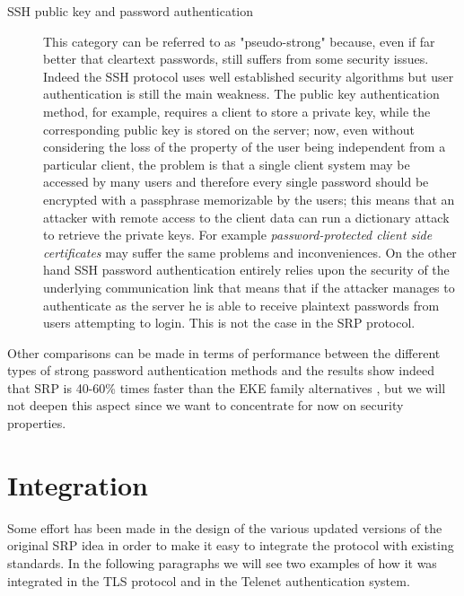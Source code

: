 \documentclass[11pt]{article}
\begin{document}
\begin{description}
	\item [SSH public key and password authentication] This category can be referred to as "pseudo-strong" because, even if far better that cleartext passwords, still suffers from some security issues. Indeed the SSH protocol uses well established security algorithms but user authentication is still the main weakness. The public key authentication method, for example, requires a client to store a private key, while the corresponding public key is stored on the server; now, even without considering the loss of the property of the user being independent from a particular client, the problem is that a single client system may be accessed by many users and therefore every single password should be encrypted with a passphrase memorizable by the users; this means that an attacker with remote access to the client data can run a dictionary attack to retrieve the private keys. For example \emph{password-protected client side certificates} may suffer the same problems and inconveniences. On the other hand SSH password authentication entirely relies upon the security of the underlying communication link that means that if the attacker manages to authenticate as the server he is able to receive plaintext passwords from users attempting to login. This is not the case in the SRP protocol.
\end{description}

Other comparisons can be made in terms of performance between the different types of strong password authentication methods and the results show indeed that SRP is 40-60\% times faster than the EKE family alternatives \cite{srp}, but we will not deepen this aspect since we want to concentrate for now on security properties.

\section{Integration}
Some effort has been made in the design of the various updated versions of the original SRP idea in order to make it easy to integrate the protocol with existing standards. In the following paragraphs we will see two examples of how it was integrated in the TLS protocol and in the Telenet authentication system. 
\end{document}
